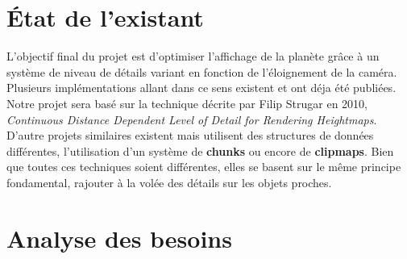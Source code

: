 \documentclass[12pt]{report}
\begin{document}
\newpage

\chapter*{État de l'existant}
\setcounter{chapter}{2}

L'objectif final du projet est d'optimiser l'affichage de la planète grâce à un système de niveau de détails variant en fonction de l'éloignement de la caméra. Plusieurs implémentations allant dans ce sens existent et ont déja été publiées.
Notre projet sera basé sur la technique décrite par Filip Strugar en 2010, \textit{Continuous Distance Dependent Level of Detail for Rendering Heightmaps}.
D'autre projets similaires existent mais utilisent des structures de données différentes, l'utilisation d'un système de \textbf{chunks} ou encore de \textbf{clipmaps}. Bien que toutes ces techniques soient différentes, elles se basent sur le même principe fondamental, rajouter à la volée des détails sur les objets proches.



\newpage

\chapter*{Analyse des besoins}
\setcounter{chapter}{3}


\end{document}
